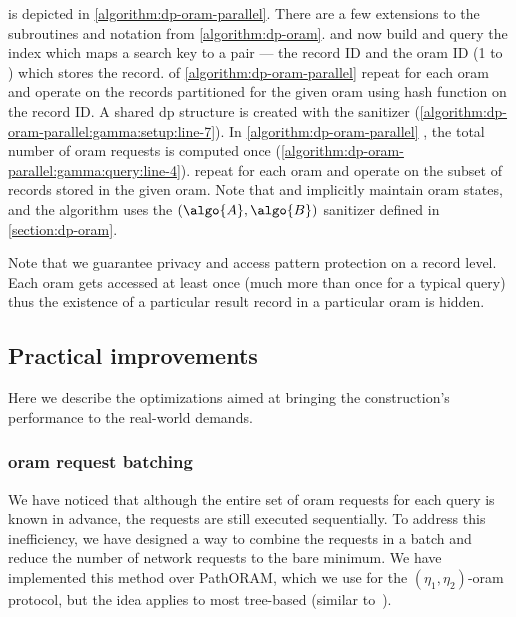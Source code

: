 		\protocolGamma{} is depicted in \cref{algorithm:dp-oram-parallel}.
		There are a few extensions to the subroutines and notation from \cref{algorithm:dp-oram}.
		 and  now build and query the index which maps a search key to a pair --- the record ID and the \acrshort{oram} ID (1 to \oramsNumber{}) which stores the record.
		 of \cref{algorithm:dp-oram-parallel} \protocolSetup{} repeat for each \acrshort{oram} and operate on the records partitioned for the given \acrshort{oram} using hash function  on the record ID\@.
		A shared \acrshort{dp} structure is created with the sanitizer  (\cref{algorithm:dp-oram-parallel:gamma:setup:line-7}).
		In \cref{algorithm:dp-oram-parallel} \protocolQuery{}, the total number of \acrshort{oram} requests is computed once (\cref{algorithm:dp-oram-parallel:gamma:query:line-4}).
		 repeat for each \acrshort{oram} and operate on the subset of records stored in the given \acrshort{oram}.
		Note that \user{} and \server{} implicitly maintain \oramsNumber{} \acrshort{oram} states, and the algorithm uses the $(\algo{A}, \algo{B})$ sanitizer defined in \cref{section:dp-oram}.

		Note that we guarantee privacy and access pattern protection on a record level.
		Each \acrshort{oram} gets accessed at least once (much more than once for a typical query) thus the existence of a particular result record in a particular \acrshort{oram} is hidden.

	\subsection{Practical improvements}\label{section:dp-improvements}

		Here we describe the optimizations aimed at bringing the construction's performance to the real-world demands.

		\subsubsection{\acrshort{oram} request batching}\label{section:dp-improvements:oram-batching}

			We have noticed that although the entire set of \acrshort{oram} requests for each query is known in advance, the requests are still executed sequentially.
			To address this inefficiency, we have designed a way to combine the requests in a batch and reduce the number of network requests to the bare minimum.
			We have implemented this method over PathORAM, which we use for the $(\eta_1, \eta_2)$-\acrshort{oram} protocol, but the idea applies to most tree-based  (similar to~\cite{parallel-oram-improved}).

